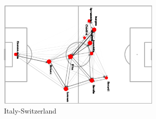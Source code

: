 \documentclass[12pt, a4paper]{article}
\begin{document}
\begin{figure}[H]
    \centering
    \includegraphics[width=0.7\textwidth]{../NoSubs/ImagesToRedo/Italy_Network_Italy_Switzerland.png}
    \caption{Italy-Switzerland}
    \label{fig: spain_sweden}
\end{figure}

\end{document}
